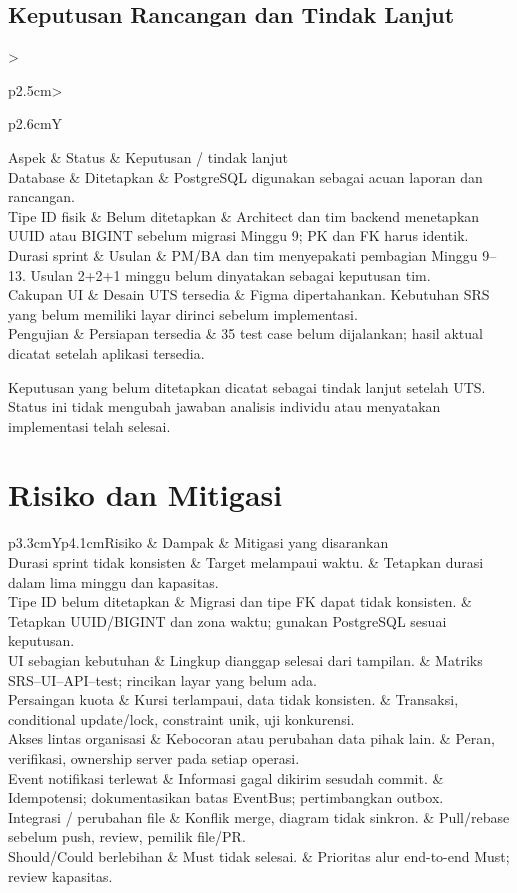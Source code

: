 \documentclass[11pt,a4paper]{article}
\newcommand{\tbl}[2]{\par\smallskip\noindent\begin{tabularx}{\linewidth}{#1}\toprule #2\bottomrule\end{tabularx}\par\smallskip}
\newcommand{\page}[1]{\clearpage\section{#1}}
\begin{document}
\subsection{Keputusan Rancangan dan Tindak Lanjut}
\tbl{>{\raggedright\arraybackslash}p{2.5cm}>{\raggedright\arraybackslash}p{2.6cm}Y}{Aspek & Status & Keputusan / tindak lanjut\\\midrule
Database & Ditetapkan & PostgreSQL digunakan sebagai acuan laporan dan rancangan.\\
Tipe ID fisik & Belum ditetapkan & Architect dan tim backend menetapkan UUID atau BIGINT sebelum migrasi Minggu 9; PK dan FK harus identik.\\
Durasi sprint & Usulan & PM/BA dan tim menyepakati pembagian Minggu 9--13. Usulan 2+2+1 minggu belum dinyatakan sebagai keputusan tim.\\
Cakupan UI & Desain UTS tersedia & Figma dipertahankan. Kebutuhan SRS yang belum memiliki layar dirinci sebelum implementasi.\\
Pengujian & Persiapan tersedia & 35 test case belum dijalankan; hasil aktual dicatat setelah aplikasi tersedia.\\}
Keputusan yang belum ditetapkan dicatat sebagai tindak lanjut setelah UTS. Status ini tidak mengubah jawaban analisis individu atau menyatakan implementasi telah selesai.
\page{Risiko dan Mitigasi}
\tbl{p{3.3cm}Yp{4.1cm}}{Risiko & Dampak & Mitigasi yang disarankan\\\midrule
Durasi sprint tidak konsisten & Target melampaui waktu. & Tetapkan durasi dalam lima minggu dan kapasitas.\\
Tipe ID belum ditetapkan & Migrasi dan tipe FK dapat tidak konsisten. & Tetapkan UUID/BIGINT dan zona waktu; gunakan PostgreSQL sesuai keputusan.\\
UI sebagian kebutuhan & Lingkup dianggap selesai dari tampilan. & Matriks SRS--UI--API--test; rincikan layar yang belum ada.\\
Persaingan kuota & Kursi terlampaui, data tidak konsisten. & Transaksi, conditional update/lock, constraint unik, uji konkurensi.\\
Akses lintas organisasi & Kebocoran atau perubahan data pihak lain. & Peran, verifikasi, ownership server pada setiap operasi.\\
Event notifikasi terlewat & Informasi gagal dikirim sesudah commit. & Idempotensi; dokumentasikan batas EventBus; pertimbangkan outbox.\\
Integrasi / perubahan file & Konflik merge, diagram tidak sinkron. & Pull/rebase sebelum push, review, pemilik file/PR.\\
Should/Could berlebihan & Must tidak selesai. & Prioritas alur end-to-end Must; review kapasitas.\\}
\end{document}
